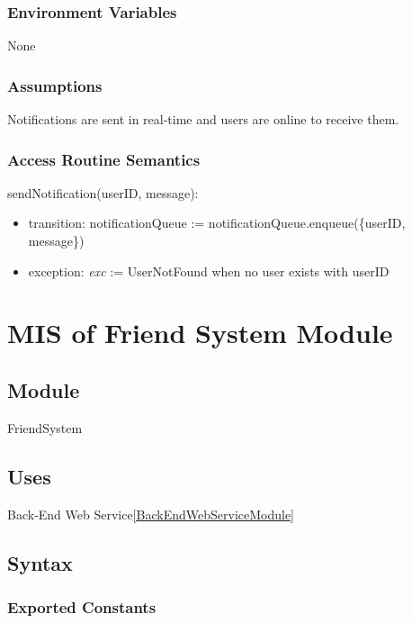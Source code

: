\documentclass[12pt, titlepage]{article}
\begin{document}
\subsubsection{Environment Variables}

None

\subsubsection{Assumptions}

Notifications are sent in real-time and users are online to receive them.

\subsubsection{Access Routine Semantics}

\noindent sendNotification(userID, message):
\begin{itemize}
\item transition: notificationQueue := notificationQueue.enqueue(\{userID, message\})
\item exception: \textit{exc} := UserNotFound when no user exists with userID
\end{itemize}

\newpage

\section{MIS of Friend System Module} \label{FriendSysModule}

\subsection{Module}

FriendSystem

\subsection{Uses}

Back-End Web Service\ref{BackEndWebServiceModule}

\subsection{Syntax}

\subsubsection{Exported Constants}
\end{document}
